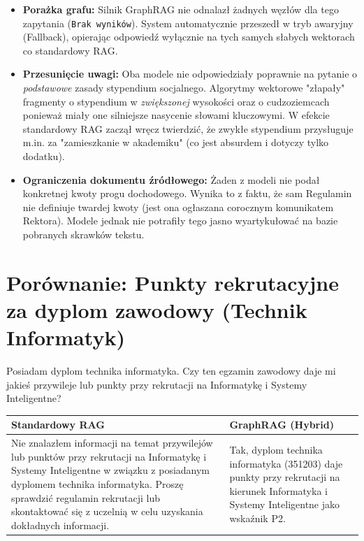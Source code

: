 \begin{tcolorbox}[colback=red!5!white,colframe=red!50!black,title=Wnioski i obserwacje]
    \begin{itemize}
        \item \textbf{Porażka grafu:} Silnik GraphRAG nie odnalazł żadnych węzłów dla tego zapytania (\texttt{Brak wyników}). System automatycznie przeszedł w tryb awaryjny (Fallback), opierając odpowiedź wyłącznie na tych samych słabych wektorach co standardowy RAG.
        \item \textbf{Przesunięcie uwagi:} Oba modele nie odpowiedziały poprawnie na pytanie o \textit{podstawowe} zasady stypendium socjalnego. Algorytmy wektorowe "złapały" fragmenty o stypendium w \textit{zwiększonej} wysokości oraz o cudzoziemcach ponieważ miały one silniejsze nasycenie słowami kluczowymi. W efekcie standardowy RAG zaczął wręcz twierdzić, że zwykłe stypendium przysługuje m.in. za "zamieszkanie w akademiku" (co jest absurdem i dotyczy tylko dodatku).
        \item \textbf{Ograniczenia dokumentu źródłowego:} Żaden z modeli nie podał konkretnej kwoty progu dochodowego. Wynika to z faktu, że sam Regulamin nie definiuje twardej kwoty (jest ona ogłaszana corocznym komunikatem Rektora). Modele jednak nie potrafiły tego jasno wyartykułować na bazie pobranych skrawków tekstu.
    \end{itemize}
\end{tcolorbox}
\vspace{1em}

\newpage

\section*{Porównanie: Punkty rekrutacyjne za dyplom zawodowy (Technik Informatyk)}

\begin{tcolorbox}[colback=blue!5!white,colframe=blue!75!black,title=Pytanie użytkownika]
    Posiadam dyplom technika informatyka. Czy ten egzamin zawodowy daje mi jakieś przywileje lub punkty przy rekrutacji na Informatykę i Systemy Inteligentne?
\end{tcolorbox}

\noindent
\begin{tabularx}{\textwidth}{@{} XX @{}}
    \toprule
    \textbf{Standardowy RAG} & \textbf{GraphRAG (Hybrid)} \\
    \midrule
    \small 
    Nie znalazłem informacji na temat przywilejów lub punktów przy rekrutacji na Informatykę i Systemy Inteligentne w związku z posiadanym dyplomem technika informatyka. Proszę sprawdzić regulamin rekrutacji lub skontaktować się z uczelnią w celu uzyskania dokładnych informacji.
    & 
    \small 
    Tak, dyplom technika informatyka (351203) daje punkty przy rekrutacji na kierunek Informatyka i Systemy Inteligentne jako wskaźnik P2. \\
    \bottomrule
\end{tabularx}

